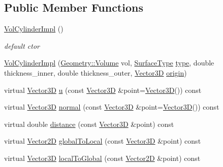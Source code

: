 \subsection*{Public Member Functions}
\begin{DoxyCompactItemize}
\item 
\hyperlink{class_d_d4hep_1_1_d_d_rec_1_1_vol_cylinder_impl_a9a2fc6a4cef827e0636f7591add7f73b}{Vol\+Cylinder\+Impl} ()
\begin{DoxyCompactList}\small\item\em default c\textquotesingle{}tor \end{DoxyCompactList}\item 
\hyperlink{class_d_d4hep_1_1_d_d_rec_1_1_vol_cylinder_impl_ac5d085d722bab6fe924dcd0bc58d0874}{Vol\+Cylinder\+Impl} (\hyperlink{class_d_d4hep_1_1_geometry_1_1_volume}{Geometry\+::\+Volume} vol, \hyperlink{class_d_d_surfaces_1_1_surface_type}{Surface\+Type} \hyperlink{class_d_d4hep_1_1_d_d_rec_1_1_vol_surface_base_aa59d5b3c519424448db12c015a95b760}{type}, double thickness\+\_\+inner, double thickness\+\_\+outer, \hyperlink{class_d_d_surfaces_1_1_vector3_d}{Vector3D} \hyperlink{class_d_d4hep_1_1_d_d_rec_1_1_vol_surface_base_a057675c3f4a66116703a467df8c348fe}{origin})
\item 
virtual \hyperlink{class_d_d_surfaces_1_1_vector3_d}{Vector3D} \hyperlink{class_d_d4hep_1_1_d_d_rec_1_1_vol_cylinder_impl_a6dd06a67301fc423f1785c814f73d906}{u} (const \hyperlink{class_d_d_surfaces_1_1_vector3_d}{Vector3D} \&point=\hyperlink{class_d_d_surfaces_1_1_vector3_d}{Vector3D}()) const
\item 
virtual \hyperlink{class_d_d_surfaces_1_1_vector3_d}{Vector3D} \hyperlink{class_d_d4hep_1_1_d_d_rec_1_1_vol_cylinder_impl_a96815a3a2f7f759ffe5028384308a1aa}{normal} (const \hyperlink{class_d_d_surfaces_1_1_vector3_d}{Vector3D} \&point=\hyperlink{class_d_d_surfaces_1_1_vector3_d}{Vector3D}()) const
\item 
virtual double \hyperlink{class_d_d4hep_1_1_d_d_rec_1_1_vol_cylinder_impl_a34013e2fc45f1312dea83210f9c30751}{distance} (const \hyperlink{class_d_d_surfaces_1_1_vector3_d}{Vector3D} \&point) const
\item 
virtual \hyperlink{class_d_d_surfaces_1_1_vector2_d}{Vector2D} \hyperlink{class_d_d4hep_1_1_d_d_rec_1_1_vol_cylinder_impl_a5bcd55a843e711dff3e03eb3e14887bd}{global\+To\+Local} (const \hyperlink{class_d_d_surfaces_1_1_vector3_d}{Vector3D} \&point) const
\item 
virtual \hyperlink{class_d_d_surfaces_1_1_vector3_d}{Vector3D} \hyperlink{class_d_d4hep_1_1_d_d_rec_1_1_vol_cylinder_impl_afea034d9cc2ea238ca37e867b368df60}{local\+To\+Global} (const \hyperlink{class_d_d_surfaces_1_1_vector2_d}{Vector2D} \&point) const
\end{DoxyCompactItemize}
